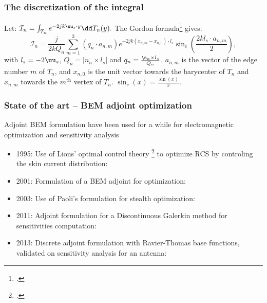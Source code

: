 \documentclass[beamer]{standalone}
\begin{document}

\begin{frame}
    \frametitle{The discretization of the integral}
    \label{fra:integral-discretization}


    Let: $\mathcal I_n = \int_{T_n}e^{-2jk\uu_s\cdot y}\dd T_n(y).$
    \pause
    The Gordon formula\footcite{Laval2006} gives:%
    \begin{equation}
        \mathcal I_n=\frac{j}{2kQ_n}\sum_{m=1}^{3}(q_n\cdot a_{n,m})e^{-2jk(x_{n,m}-x_{n,0})\cdot l_s}\sin_c\left(\frac{2k l_s\cdot a_{n,m}}{2}\right),
    \end{equation}%
    \small
    with $l_s = -2 \uu_s$, $Q_n = |n_n\times l_s|$ and $q_n = \frac{\n_n\times l_s}{Q_n}$. $a_{n,m}$ is the vector of the edge number $m$ of $T_n$, and $x_{n,0}$ is the unit vector towards the barycenter of $T_n$ and $x_{n,m}$ towards the $m^{\text{th}}$ vertex of $T_n$. $\sin_c(x) = \frac{\sin(x)}{x}$.    

    \hyperlink{fra:discrete-physical-optics}{}
\end{frame}



\begin{frame}
    \frametitle{State of the art -- BEM adjoint optimization}
    \small
    Adjoint BEM formulation have been used for a while for electromagnetic optimization and sensitivity analysis
    \begin{itemize}[label=,leftmargin=5mm]
        \item 1995: Use of Lions' optimal control theory \footcite{Lions1968} to optimize RCS by controling the skin current distribution: \cite{Bardos1995}
        \item 2001: Formulation of a BEM adjoint for optimization: \cite{Paoli2001}
        \item 2003: Use of Paoli's formulation for stealth optimization: \cite{Roge2003}
        \item 2011: Adjoint formulation for a Discontinuous Galerkin method for sensitivities computation: \cite{Wang2011}
        \item 2013: Discrete adjoint formulation with Ravier-Thomas base functions, validated on sensitivity analysis for an antenna: \cite{Kataja2013}
    \end{itemize}
\end{frame}
\end{document}
